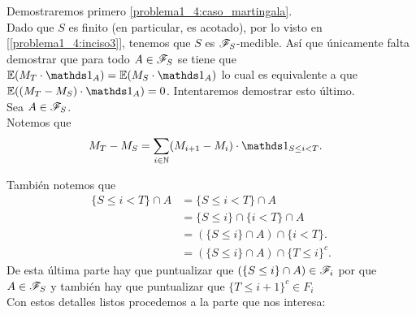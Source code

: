 	Demostraremos primero \eqref{problema1_4:caso_martingala}.\\
	
	 Dado que $S$ es finito (en particular, es acotado), por lo visto en [\ref{problema1_4:inciso3}], 
	 tenemos que $S$ es $\mathscr{F}_S$-medible. Así que únicamente falta demostrar que para todo $A \in \mathscr{F}_S$ se tiene que 
	 $\E(M_T \cdot \indic_A) = \E(M_S \cdot \indic_A)$ lo cual es equivalente a que $\E((M_T - M_S) \cdot \indic_A) = 0$.
	 Intentaremos demostrar esto último.\\
	 
	 Sea $A \in \mathscr{F}_S$.\\
	 
	 Notemos que	 
	 \begin{align}
	 	M_T - M_S &= \sum_{ i \in \N} ( M_{i+1} - M_i) \cdot \indic_{S \leq i < T }. 
	 \end{align}

	 También notemos que 
	 \begin{align}
	 	\{S \leq i < T \} \cap A 	&=		\{S \leq i < T \} \cap A 						\\
	 								&=		\{S \leq i \} \cap \{ i < T \} \cap A 			\\
	 								&=		(\{S \leq i \} \cap A) \cap \{ i < T \}.  		\\
	 								&=		(\{S \leq i \} \cap A) \cap \{ T \leq i \}^c.
	 \end{align}	 
	 \null
	 \null
	 \;De esta última parte hay que puntualizar que $(\{S \leq i \} \cap A) \in \mathscr{F}_i$ por que $A \in \mathscr{F}_S$ y también
	 hay que puntualizar que $\{ T \leq i + 1 \}^c \in F_{i}$\\
	 
	 Con estos detalles listos procedemos a la parte que nos interesa:
	 
